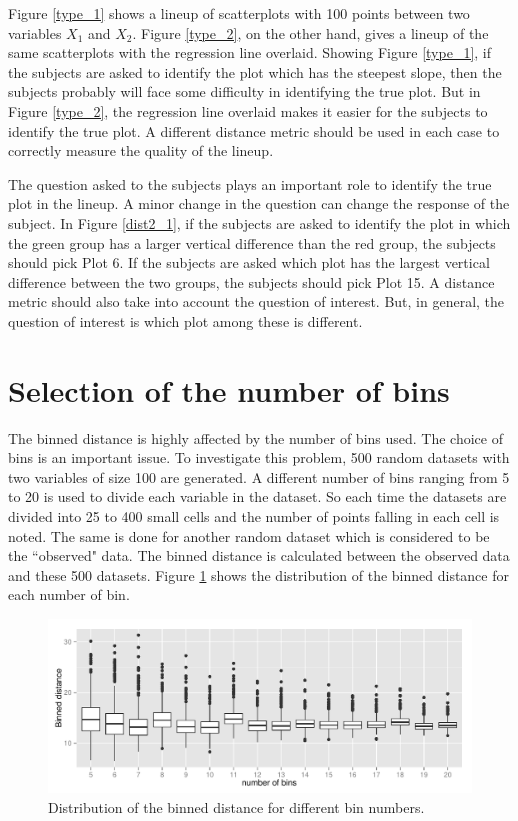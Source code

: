 \documentclass[12]{article}
\begin{document}
Figure \ref{type_1} shows a lineup of scatterplots with 100 points between two variables $X_1$ and $X_2$. Figure \ref{type_2}, on the other hand, gives a lineup of the same scatterplots with the regression line overlaid. Showing Figure \ref{type_1}, if the subjects are asked to identify the plot which has the steepest slope, then the subjects probably will face some difficulty in identifying the true plot. But in Figure \ref{type_2}, the regression line overlaid makes it easier for the subjects to identify the true plot. A different distance metric should be used in each case to correctly measure the quality of the lineup.

The question asked to the subjects plays an important role to identify the true plot in the lineup. A minor change in the question can change the response of the subject. In Figure \ref{dist2_1}, if the subjects are asked to identify the plot in which the green group has a larger vertical difference than the red group, the subjects should pick Plot 6. If the subjects are asked which plot has the largest vertical difference between the two groups, the subjects should pick Plot 15. A distance metric should also take into account the question of interest. But, in general, the question of interest is which plot among these is different.



\section{Selection of the number of bins}

The binned distance is highly affected by the number of bins used. The choice of bins is an important issue. To investigate this problem, 500 random datasets with two variables of size 100 are generated. A different number of bins ranging from 5 to 20 is used to divide each variable in the dataset. So each time the datasets are divided into 25 to 400 small cells and the number of points falling in each cell is noted. The same is done for another random dataset which is considered to be the ``observed" data. The binned distance is calculated between the observed data and these 500 datasets. Figure \ref{nbin} shows the distribution of the binned distance for each number of bin.

\begin{figure}[htbp]
\centering
\includegraphics[width=.6\textwidth]{nbin-100.pdf}
\caption{Distribution of the binned distance for different bin numbers.}
\label{nbin}
\end{figure}
\end{document}
